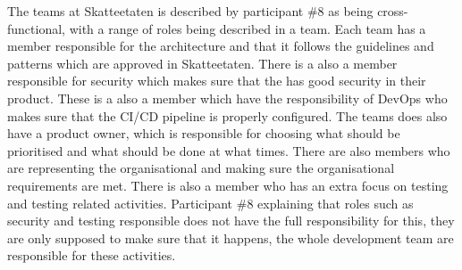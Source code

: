 The teams at Skatteetaten is described by participant \#8 as being cross-functional, with a range of roles being described in a team. Each team has a member responsible for the architecture and that it follows the guidelines and patterns which are approved in Skatteetaten. There is a also a member responsible for security which makes sure that the has good security in their product. These is a also a member which have the responsibility of DevOps who makes sure that the CI/CD pipeline is properly configured. The teams does also have a product owner, which is responsible for choosing what should be prioritised and what should be done at what times. There are also members who are representing the organisational and making sure the organisational requirements are met. There is also a member who has an extra focus on testing and testing related activities. Participant \#8 explaining that roles such as security and testing responsible does not have the full responsibility for this, they are only supposed to make sure that it happens, the whole development team are responsible for these activities.



